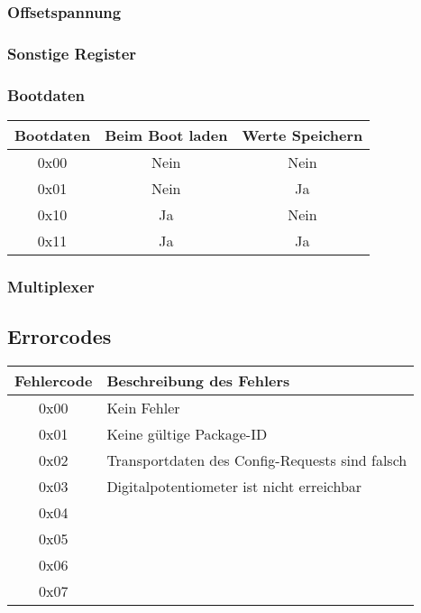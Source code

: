 \lstset{style=C}

\subsubsection{Offsetspannung}
\subsubsection{Sonstige Register}
\subsubsection*{Bootdaten}

\begin{flushleft}
\begin{tabular}{c||c|c}
Bootdaten & Beim Boot laden & Werte Speichern\\
\hline
\hline
0x00 & Nein & Nein \\
\hline
0x01 & Nein & Ja\\
\hline
0x10 & Ja & Nein \\
\hline
0x11 & Ja & Ja \\
\end{tabular}
\end{flushleft}


\subsubsection*{Multiplexer}
\subsection{Errorcodes}

\begin{flushleft}
\begin{tabular}{c||l}
Fehlercode & Beschreibung des Fehlers \\
\hline
\hline
0x00 & Kein Fehler \\
\hline
0x01 & Keine gültige Package-ID \\
\hline
0x02 & Transportdaten des Config-Requests sind falsch \\
\hline
0x03 & Digitalpotentiometer ist nicht erreichbar \\
\hline
0x04 &  \\
\hline
0x05 &  \\
\hline
0x06 &  \\
\hline
0x07 &  \\

\end{tabular}
\end{flushleft}
